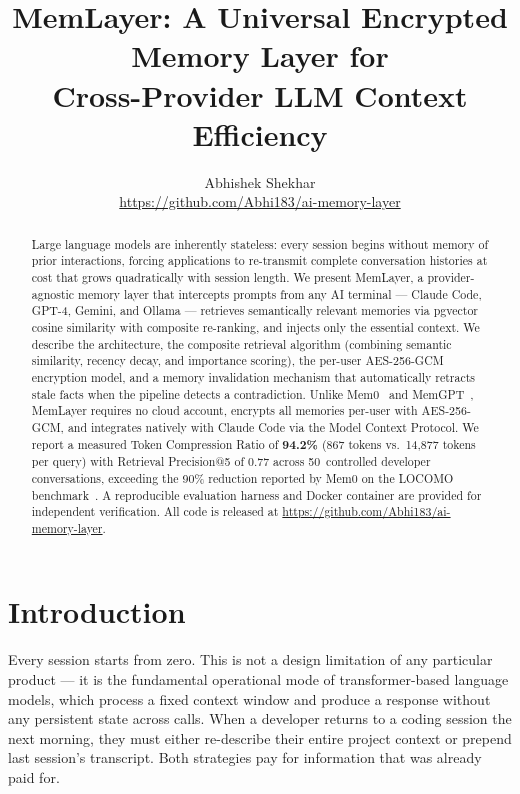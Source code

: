 \documentclass[10pt,twocolumn]{article}
\title{MemLayer: A Universal Encrypted Memory Layer for\\Cross-Provider LLM Context Efficiency}
\author{Abhishek Shekhar\\
\url{https://github.com/Abhi183/ai-memory-layer}}
\date{}
\begin{document}
\maketitle

\begin{abstract}
Large language models are inherently stateless: every session begins without
memory of prior interactions, forcing applications to re-transmit complete
conversation histories at cost that grows quadratically with session length.
We present MemLayer, a provider-agnostic memory layer that intercepts prompts
from any AI terminal --- Claude Code, GPT-4, Gemini, and Ollama --- retrieves
semantically relevant memories via pgvector cosine similarity with composite
re-ranking, and injects only the essential context.
We describe the architecture, the composite retrieval algorithm (combining
semantic similarity, recency decay, and importance scoring), the per-user
AES-256-GCM encryption model, and a memory invalidation mechanism that
automatically retracts stale facts when the pipeline detects a contradiction.
Unlike Mem0~\citep{chhikara2025mem0} and MemGPT~\citep{packer2023memgpt},
MemLayer requires no cloud account, encrypts all memories per-user with
AES-256-GCM, and integrates natively with Claude Code via the Model Context
Protocol.
We report a measured Token Compression Ratio of \textbf{94.2\%} (867 tokens
vs.\ 14,877 tokens per query) with Retrieval Precision@5 of 0.77 across
50~controlled developer conversations, exceeding the 90\% reduction reported
by Mem0 on the LOCOMO benchmark~\citep{chhikara2025mem0}.
A reproducible evaluation harness and Docker container are provided for
independent verification.
All code is released at \url{https://github.com/Abhi183/ai-memory-layer}.
\end{abstract}

\section{Introduction}
\label{sec:intro}

\noindent
Every session starts from zero. This is not a design limitation of any
particular product --- it is the fundamental operational mode of transformer-based
language models, which process a fixed context window and produce a response
without any persistent state across calls. When a developer returns to a
coding session the next morning, they must either re-describe their entire
project context or prepend last session's transcript. Both strategies pay for
information that was already paid for.
\end{document}
